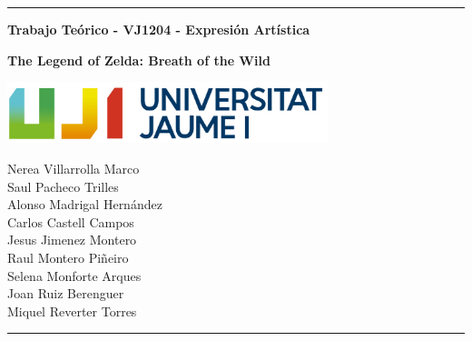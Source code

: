 \documentclass[12pt]{article}
\date{}
\begin{document}
    \begin{titlepage}

        \centering
        \hrule
        \vspace{1cm}
        {\bfseries\huge Trabajo Teórico - VJ1204 - Expresión Artística \par}
        \vspace{1cm}
        {\bfseries\huge The Legend of Zelda: Breath of the Wild \par}
        \vspace{3cm}
        {\includegraphics[width=0.7\textwidth]{images/UJI_logo.jpg} \par}
        \vspace{4cm}

        {\large
        Nerea Villarrolla Marco \\
        Saul Pacheco Trilles \\
        Alonso Madrigal Hernández \\
        Carlos Castell Campos \\
        Jesus Jimenez Montero \\
        Raul Montero Piñeiro \\
        Selena Monforte Arques \\
        Joan Ruiz Berenguer \\
        Miquel Reverter Torres\\
        \par}
        \vspace{10cm}
        \hrule

    \end{titlepage}

\newpage
\begin{abstract}
    En el siguiente documento hablaremos sobre las bases artísticas del videojuego “The Legend Of Zelda: Breath of the wild". Tanto del director de concept art como un atisbo de información sobre el juego. Finalemnete acabaremos con el analisis artistico profundo de varios fan arts.

\end{abstract}
\end{document}
